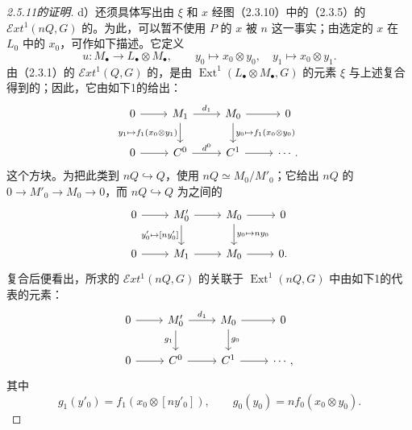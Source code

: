\begin{proof}[2.5.11的证明]
 d）还须具体写出由 $\xi$ 和 $x$ 经图（2.3.10）中的（2.3.5）的 $\mathcal Ext^1(nQ,G)$ 的。为此，可以暂不使用 $P$ 的 $x$ 被 $n$ 这一事实；由选定的 $x$ 在 $L_0$ 中的 $x_0$，可作如下描述。它定义
\[u:M_\bullet\longrightarrow L_\bullet\otimes M_\bullet,
\qquad y_0\longmapsto x_0\otimes y_0,\quad y_1\longmapsto x_0\otimes y_1.\]
由（2.3.1）的 $\mathcal Ext^1(Q,G)$ 的，是由 $\operatorname{Ext}^1(L_\bullet\otimes M_\bullet,G)$ 的元素 $\xi$ 与上述复合得到的；因此，它由如下1的给出：
\[\begin{tikzcd}
0\arrow[r]&M_1\arrow[r,"d_1"]\arrow[d,"{y_1\mapsto f_1(x_0\otimes y_1)}"']&M_0\arrow[r]\arrow[d,"{y_0\mapsto f_1(x_0\otimes y_0)}"]&0\\
0\arrow[r]&C^0\arrow[r,"d^0"]&C^1\arrow[r]&\cdots .
\end{tikzcd}\]
这个方块。为把此类到 $nQ\hookrightarrow Q$，使用 $nQ\simeq M_0/M'_0$；它给出 $nQ$ 的 $0\longrightarrow M'_0\longrightarrow M_0\longrightarrow0$，而 $nQ\hookrightarrow Q$ 为之间的
\[\begin{tikzcd}
0\arrow[r]&M'_0\arrow[r]\arrow[d,"{y'_0\mapsto[ny'_0]}"']&M_0\arrow[r]\arrow[d,"{y_0\mapsto ny_0}"]&0\\
0\arrow[r]&M_1\arrow[r]&M_0\arrow[r]&0.
\end{tikzcd}\]
复合后便看出，所求的 $\mathcal Ext^1(nQ,G)$ 的关联于 $\operatorname{Ext}^1(nQ,G)$ 中由如下1的代表的元素：
\[\begin{tikzcd}
0\arrow[r]&M'_0\arrow[r,"d_1"]\arrow[d,"g_1"']&M_0\arrow[r]\arrow[d,"g_0"]&0\\
0\arrow[r]&C^0\arrow[r]&C^1\arrow[r]&\cdots,
\end{tikzcd}\]
其中
\[g_1(y'_0)=f_1(x_0\otimes[ny'_0]),\qquad g_0(y_0)=nf_0(x_0\otimes y_0).\]


\end{proof}
